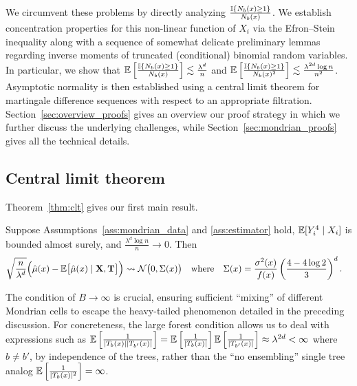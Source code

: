 We circumvent these problems by directly analyzing
$\frac{\mathbb{I}\{N_b(x) \geq 1\}}{N_b(x)}$.
We establish concentration properties
for this non-linear function of $X_i$ via the Efron--Stein inequality
\citep[Section 3.1]{boucheron2016concentration}
along with a sequence of somewhat delicate preliminary lemmas regarding
inverse moments of truncated (conditional) binomial random variables.
In particular, we show that
$\mathbb{E} \left[ \frac{\mathbb{I} \{N_b(x) \geq 1\}}{N_b(x)} \right]
\lesssim \frac{\lambda^d}{n}$
and
$\mathbb{E} \left[ \frac{\mathbb{I} \{N_b(x) \geq 1\}}{N_b(x)^2} \right]
\lesssim \frac{\lambda^{2d} \log n}{n^2}$.
Asymptotic normality is then established
using a central limit theorem for martingale difference sequences
\citep[Theorem~3.2]{hall2014martingale}
with respect to an appropriate filtration.
Section~\ref{sec:overview_proofs} gives an overview our proof strategy in
which  we further discuss the underlying challenges,
while Section~\ref{sec:mondrian_proofs} gives all the technical details.

\subsection{Central limit theorem}
\label{sec:mondrian_clt}

Theorem~\ref{thm:clt} gives our first main result.

\begin{theorem}%
  \label{thm:clt}
  Suppose Assumptions~\ref{ass:mondrian_data} and \ref{ass:estimator} hold,
  $\mathbb{E}[Y_i^4 \mid X_i ]$ is bounded almost surely,
  and $\frac{\lambda^d \log n}{n} \to 0$. Then
  \begin{align*}
    \sqrt{\frac{n}{\lambda^d}}
    \Big(
      \hat \mu(x)
      - \mathbb{E} \big[ \hat \mu(x) \mid \mathbf{X}, \mathbf{T} \big]
    \Big)
    &\rightsquigarrow
    \mathcal{N}\big(0, \Sigma(x)\big)
    &                &\text{where}
    &\Sigma(x)
    &=
    \frac{\sigma^2(x)}{f(x)}
    \left(
      \frac{4 - 4 \log 2}{3 }
    \right)^d.
  \end{align*}
\end{theorem}

The condition of $B \to \infty$ is crucial,
ensuring sufficient ``mixing'' of different Mondrian cells to escape the
heavy-tailed phenomenon detailed in the preceding discussion.
For concreteness, the large forest condition allows us to deal
with expressions such as
$\mathbb{E} \left[ \frac{1}{|T_b(x)| |T_{b'}(x)|} \right] =
\mathbb{E} \left[ \frac{1}{|T_b(x)|} \right] \mathbb{E} \left[ \frac{1}{|T_{b'}(x)|} \right]
\approx \lambda^{2d} < \infty$
where $b \neq b'$, by independence of the trees, rather than
the ``no ensembling'' single tree analog
$\mathbb{E} \left[ \frac{1}{|T_b(x)|^2} \right] = \infty$.

